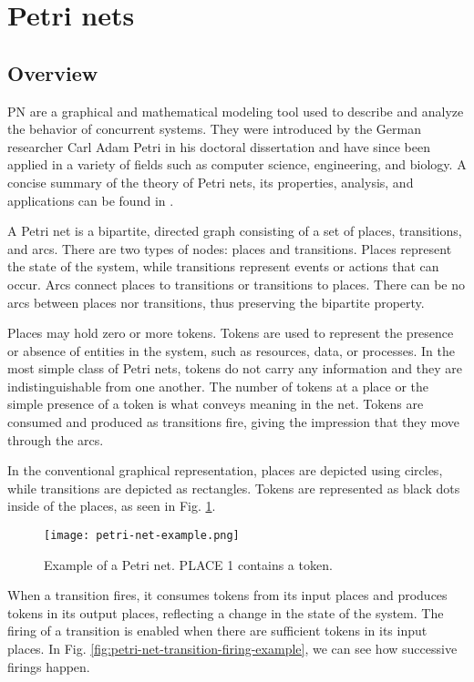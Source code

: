 \documentclass[../Thesis.tex]{subfiles}
\begin{document}
\section{Petri nets}

\subsection{Overview}

\acrfull{PN} are a graphical and mathematical modeling tool
used to describe and analyze the behavior of concurrent systems.
They were introduced by the German researcher
Carl Adam Petri in his doctoral dissertation \cite{petri1962}
and have since been applied in a variety of fields
such as computer science, engineering, and biology.
A concise summary of the theory of Petri nets,
its properties, analysis, and applications can be found in \cite{murata1989}.

A Petri net is a bipartite, directed graph
consisting of a set of places, transitions, and arcs.
There are two types of nodes: places and transitions.
Places represent the state of the system,
while transitions represent events or actions that can occur.
Arcs connect places to transitions or transitions to places.
There can be no arcs between places nor transitions,
thus preserving the bipartite property.

Places may hold zero or more tokens.
Tokens are used to represent the presence or absence of entities in the system,
such as resources, data, or processes.
In the most simple class of Petri nets,
tokens do not carry any information and they are indistinguishable from one another.
The number of tokens at a place or the simple presence of a token is
what conveys meaning in the net.
Tokens are consumed and produced as transitions fire,
giving the impression that they move through the arcs.

In the conventional graphical representation,
places are depicted using circles, while transitions are depicted as rectangles.
Tokens are represented as black dots inside of the places,
as seen in Fig. \ref{fig:petri-net-example}.

\begin{figure}[H]
    \centering
    \texttt{[image: petri-net-example.png]}
    \caption{Example of a Petri net. \uppercase{PLACE 1} contains a token.}
    \label{fig:petri-net-example}
\end{figure}

When a transition fires, it consumes tokens from its input places and
produces tokens in its output places, reflecting a change in the state of the system.
The firing of a transition is enabled when there are sufficient tokens in its input places.
In Fig. \ref{fig:petri-net-transition-firing-example}, we can see how successive firings happen.
\end{document}
